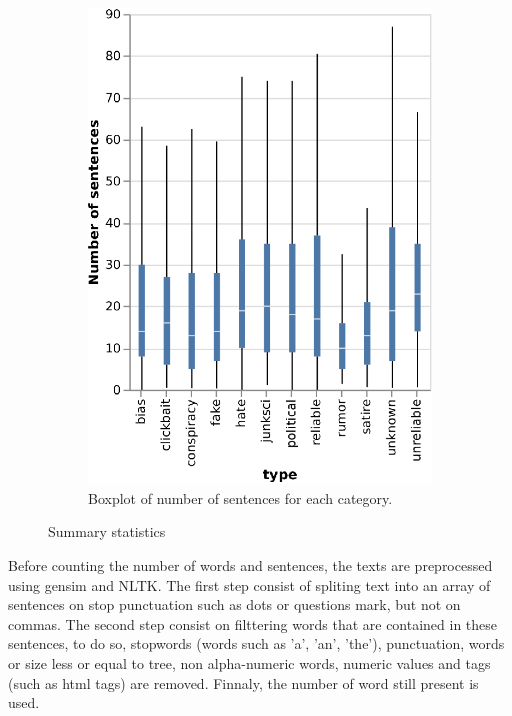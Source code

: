 \begin{figure}[h]
\begin{subfigure}[b]{0.4\textwidth}
    \includegraphics{chapter/images/data_exploration/boxplot_full_numSentences.eps}
    \caption{Boxplot of number of sentences for each category.}
  \end{subfigure}
  \caption{Summary statistics}
  \label{fig:data_explo:stats1}
\end{figure}

Before counting the number of words and sentences, the texts are preprocessed using gensim\cite{rehurek_lrec} and NLTK\cite{BirdKleinLoper09}. The first step consist of spliting text into an array of sentences on stop punctuation such as dots or questions mark, but not on commas. The second step consist on filttering words that are contained in these sentences, to do so, stopwords (words such as 'a', 'an', 'the'), punctuation, words or size less or equal to tree, non alpha-numeric words, numeric values and tags (such as html tags) are removed. Finnaly, the number of word still present is used. 

